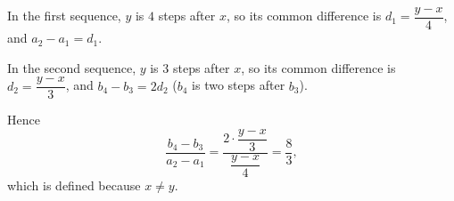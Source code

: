 In the first sequence, $y$ is $4$ steps after $x$, so its common difference is $d_1=\dfrac{y-x}{4}$, and $a_2-a_1=d_1$.

In the second sequence, $y$ is $3$ steps after $x$, so its common difference is $d_2=\dfrac{y-x}{3}$, and $b_4-b_3=2d_2$ ($b_4$ is two steps after $b_3$).

Hence
\[
\dfrac{b_4-b_3}{a_2-a_1}=\dfrac{2\cdot\dfrac{y-x}{3}}{\dfrac{y-x}{4}}=\boxed{\dfrac{8}{3}},
\]
which is defined because $x\ne y$.
